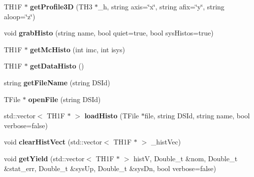 \begin{DoxyCompactItemize}
\item 
\hypertarget{classDrawPlots_a55b302f89c3ee185da0dc015300e7f35}{
TH1F $\ast$ {\bfseries getProfile3D} (TH3 $\ast$\_\-h, string axis=\char`\"{}x\char`\"{}, string afix=\char`\"{}y\char`\"{}, string aloop=\char`\"{}z\char`\"{})}
\label{classDrawPlots_a55b302f89c3ee185da0dc015300e7f35}

\item 
\hypertarget{classDrawPlots_a4c5a1021daec624d84c29982697b011e}{
void {\bfseries grabHisto} (string name, bool quiet=true, bool sysHistos=true)}
\label{classDrawPlots_a4c5a1021daec624d84c29982697b011e}

\item 
\hypertarget{classDrawPlots_a30645eadb379683bc25dfc167be47fb0}{
TH1F $\ast$ {\bfseries getMcHisto} (int imc, int isys)}
\label{classDrawPlots_a30645eadb379683bc25dfc167be47fb0}

\item 
\hypertarget{classDrawPlots_ab0aa801fb2b721af2454aaf3b5b22fc8}{
TH1F $\ast$ {\bfseries getDataHisto} ()}
\label{classDrawPlots_ab0aa801fb2b721af2454aaf3b5b22fc8}

\item 
\hypertarget{classDrawPlots_a0b42cd735701b574bea7acb2a7a93a63}{
string {\bfseries getFileName} (string DSId)}
\label{classDrawPlots_a0b42cd735701b574bea7acb2a7a93a63}

\item 
\hypertarget{classDrawPlots_ac2fa835213f2244f6b4eab40265244f4}{
TFile $\ast$ {\bfseries openFile} (string DSId)}
\label{classDrawPlots_ac2fa835213f2244f6b4eab40265244f4}

\item 
\hypertarget{classDrawPlots_a9eacaf53ce381d4f7770ca6e7c7f5f4e}{
std::vector$<$ TH1F $\ast$ $>$ {\bfseries loadHisto} (TFile $\ast$file, string DSId, string name, bool verbose=false)}
\label{classDrawPlots_a9eacaf53ce381d4f7770ca6e7c7f5f4e}

\item 
\hypertarget{classDrawPlots_aa1cbc3d1a7cdc18ceabe9069573d5286}{
void {\bfseries clearHistVect} (std::vector$<$ TH1F $\ast$ $>$ \_\-histVec)}
\label{classDrawPlots_aa1cbc3d1a7cdc18ceabe9069573d5286}

\item 
\hypertarget{classDrawPlots_ac269c9397db8f791395fe90ac2646de8}{
void {\bfseries getYield} (std::vector$<$ TH1F $\ast$ $>$ histV, Double\_\-t \&nom, Double\_\-t \&stat\_\-err, Double\_\-t \&sysUp, Double\_\-t \&sysDn, bool verbose=false)}
\label{classDrawPlots_ac269c9397db8f791395fe90ac2646de8}


\end{DoxyCompactItemize}
